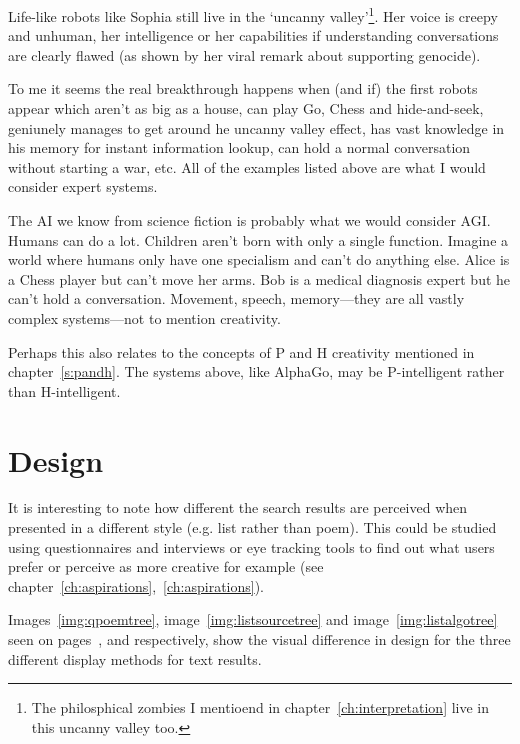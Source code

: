 Life-like robots like Sophia still live in the `uncanny valley'\footnote{The philosphical zombies I mentioend in chapter~\ref{ch:interpretation} live in this uncanny valley too.}. Her voice is creepy and unhuman, her intelligence or her capabilities if understanding conversations are clearly flawed (as shown by her viral remark about supporting genocide).

\spirals

To me it seems the real breakthrough happens when (and if) the first robots appear which aren't as big as a house, can play Go, Chess and hide-and-seek, geniunely manages to get around he uncanny valley effect, has vast knowledge in his memory for instant information lookup, can hold a normal conversation without starting a war, etc. All of the examples listed above are what I would consider expert systems. 

The \ac{AI} we know from science fiction is probably what we would consider \ac{AGI}. Humans can do a lot. Children aren't born with only a single function. Imagine a world where humans only have one specialism and can't do anything else. Alice is a Chess player but can't move her arms. Bob is a medical diagnosis expert but he can't hold a conversation. Movement, speech, memory---they are all vastly complex systems---not to mention creativity.

Perhaps this also relates to the concepts of P and H creativity mentioned in chapter~\ref{s:pandh}. The systems above, like AlphaGo, may be P-intelligent rather than H-intelligent.


\section{Design}
\label{s:designanal}

It is interesting to note how different the search results are perceived when presented in a different style (e.g. list rather than poem). This could be studied using questionnaires and interviews or eye tracking tools to find out what users prefer or perceive as more creative for example (see chapter~\ref{ch:aspirations},~\ref{ch:aspirations}). 

Images~\ref{img:qpoemtree}, image~\ref{img:listsourcetree} and image~\ref{img:listalgotree} seen on pages~\pageref{img:qpoemtree},\pageref{img:listsourcetree} and \pageref{img:qpoemtree} respectively, show the visual difference in design for the three different display methods for text results.

